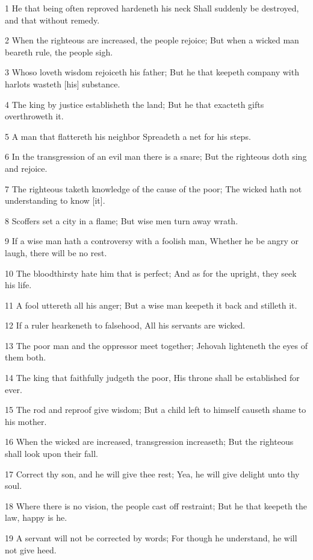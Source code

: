 \par 1 He that being often reproved hardeneth his neck Shall suddenly be destroyed, and that without remedy.
\par 2 When the righteous are increased, the people rejoice; But when a wicked man beareth rule, the people sigh.
\par 3 Whoso loveth wisdom rejoiceth his father; But he that keepeth company with harlots wasteth [his] substance.
\par 4 The king by justice establisheth the land; But he that exacteth gifts overthroweth it.
\par 5 A man that flattereth his neighbor Spreadeth a net for his steps.
\par 6 In the transgression of an evil man there is a snare; But the righteous doth sing and rejoice.
\par 7 The righteous taketh knowledge of the cause of the poor; The wicked hath not understanding to know [it].
\par 8 Scoffers set a city in a flame; But wise men turn away wrath.
\par 9 If a wise man hath a controversy with a foolish man, Whether he be angry or laugh, there will be no rest.
\par 10 The bloodthirsty hate him that is perfect; And as for the upright, they seek his life.
\par 11 A fool uttereth all his anger; But a wise man keepeth it back and stilleth it.
\par 12 If a ruler hearkeneth to falsehood, All his servants are wicked.
\par 13 The poor man and the oppressor meet together; Jehovah lighteneth the eyes of them both.
\par 14 The king that faithfully judgeth the poor, His throne shall be established for ever.
\par 15 The rod and reproof give wisdom; But a child left to himself causeth shame to his mother.
\par 16 When the wicked are increased, transgression increaseth; But the righteous shall look upon their fall.
\par 17 Correct thy son, and he will give thee rest; Yea, he will give delight unto thy soul.
\par 18 Where there is no vision, the people cast off restraint; But he that keepeth the law, happy is he.
\par 19 A servant will not be corrected by words; For though he understand, he will not give heed.
